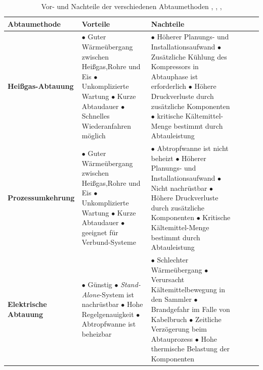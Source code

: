 \begin{table}%
\centering
\caption{Vor- und Nachteile der verschiedenen Abtaumethoden   	\citep{Breidenbach2014}, \citep{Refrigeration2000}, \citep{Yin2012}, \citep{Huang20091697}
} \vspace{6pt}

\label{fig:PCM_Slurry1}
\begin{tabular}{p{3.8cm}p{5.6cm}p{5.6cm}lll}
\hline
\textbf{Abtaumethode} &\textbf{Vorteile} & \textbf{Nachteile}\\
\hline
\hline

\textbf{Heißgas-Abtauung} 
&
$\bullet$ Guter Wärmeübergang zwischen Heißgas,Rohre und Eis
\newline								  			
$\bullet$ Unkomplizierte Wartung
\newline			  
$\bullet$ Kurze Abtaudauer		
\newline			
$\bullet$ Schnelles Wiederanfahren möglich	

&$\bullet$ Höherer Planungs- und Installationsaufwand  
\newline
$\bullet$ Zusätzliche Kühlung des Kompressors in Abtauphase ist erforderlich 
\newline 
$\bullet$ Höhere Druckverluste durch zusätzliche Komponenten 
\newline
$\bullet$ kritische Kältemittel-Menge bestimmt durch Abtauleistung \\  
   
\hline
\textbf{Prozessumkehrung}
&$\bullet$ Guter Wärmeübergang zwischen Heißgas,Rohre und Eis  													
\newline								
$\bullet$ Unkomplizierte Wartung
\newline	
$\bullet$ Kurze Abtaudauer		
\newline			 
$\bullet$ geeignet für Verbund-Systeme		
&$\bullet$ Abtropfwanne ist nicht beheizt   
\newline
$\bullet$ Höherer Planungs- und Installationsaufwand
\newline
$\bullet$ Nicht nachrüstbar
\newline
$\bullet$ Höhere Druckverluste durch zusätzliche Komponenten								
\newline
$\bullet$ Kritische Kältemittel-Menge bestimmt durch Abtauleistung\\


\hline
\textbf{Elektrische Abtauung }
&$\bullet$ Günstig 
\newline 
$\bullet$ \textit{Stand-Alone}-System ist nachrüstbar		
\newline
$\bullet$ Hohe Regelgenauigkeit	
\newline
$\bullet$ Abtropfwanne ist beheizbar 					
&
$\bullet$ Schlechter Wärmeübergang 
\newline					
$\bullet$ Verursacht Kältemittelbewegung in den Sammler
\newline 
$\bullet$ Brandgefahr im Falle von Kabelbruch  
\newline
$\bullet$ Zeitliche Verzögerung beim Abtauprozess 
\newline
$\bullet$ Hohe thermische Belastung der Komponenten    
\\


\end{tabular}
\end{table}
